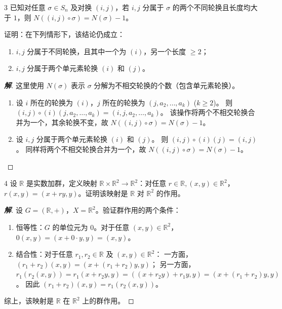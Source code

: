 \documentclass[12pt, a4paper]{article}
\newenvironment{solution}{
    \begin{proof}[\textbf{解}]
}{
    \end{proof}
}
\begin{document}
\begin{problem}{3}
    已知对任意 $\sigma \in S_n$ 及对换 $(i, j)$，若 $i, j$ 分属于 $\sigma$ 的两个不同轮换且长度均大于 $1$，则 $N((i, j) \circ \sigma) = N(\sigma) - 1$。
    
    证明：在下列情形下，该结论仍成立：
    \begin{enumerate}
        \item $i, j$ 分属于不同轮换，且其中一个为 $(i)$，另一个长度 $\ge 2$；
        \item $i, j$ 分属于两个单元素轮换 $(i)$ 和 $(j)$。
    \end{enumerate}
\end{problem}
\begin{solution}
    这里使用 $N(\sigma)$ 表示 $\sigma$ 分解为不相交轮换的个数（包含单元素轮换）。
    \begin{enumerate}
        \item 设 $i$ 所在的轮换为 $(i)$，$j$ 所在的轮换为 $(j, a_2, \dots, a_k)$ ($k \ge 2$)。
        则 $(i, j) \circ (i)(j, a_2, \dots, a_k) = (i, j, a_2, \dots, a_k)$。
        该操作将两个不相交轮换合并为一个，其余轮换不变，故 $N((i, j) \circ \sigma) = N(\sigma) - 1$。
        \item 设 $i, j$ 分属于两个单元素轮换 $(i)$ 和 $(j)$。
        则 $(i, j) \circ (i)(j) = (i, j)$。
        同样将两个不相交轮换合并为一个，故 $N((i, j) \circ \sigma) = N(\sigma) - 1$。
    \end{enumerate}
\end{solution}

\begin{problem}{4}
    设 $\mathbb{R}$ 是实数加群，定义映射 $\mathbb{R} \times \mathbb{R}^2 \to \mathbb{R}^2$：对任意 $r \in \mathbb{R}, (x, y) \in \mathbb{R}^2$，$r(x, y) = (x + ry, y)$。证明该映射是 $\mathbb{R}$ 对 $\mathbb{R}^2$ 的作用。
\end{problem}
\begin{solution}
    设 $G = (\mathbb{R}, +)$，$X = \mathbb{R}^2$。验证群作用的两个条件：
    \begin{enumerate}
        \item 恒等性：$G$ 的单位元为 $0$。对于任意 $(x, y) \in \mathbb{R}^2$，$0(x, y) = (x + 0 \cdot y, y) = (x, y)$。
        \item 结合性：对于任意 $r_1, r_2 \in \mathbb{R}$ 及 $(x, y) \in \mathbb{R}^2$：
        一方面，$(r_1 + r_2)(x, y) = (x + (r_1 + r_2)y, y)$；
        另一方面，$r_1(r_2(x, y)) = r_1(x + r_2y, y) = ((x + r_2y) + r_1y, y) = (x + (r_1 + r_2)y, y)$。
        因此 $(r_1 + r_2)(x, y) = r_1(r_2(x, y))$。
    \end{enumerate}
    综上，该映射是 $\mathbb{R}$ 在 $\mathbb{R}^2$ 上的群作用。
\end{solution}
\end{document}
